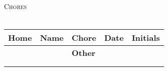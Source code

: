 \documentclass[12pt]{article}
\begin{document}
\begin{center}
  \LARGE \textsc{Chores}\\
  \\[0.5cm]

  \begin{tabularx}{\textwidth}{|c|c|X|c|c|}
    \hline
    \textbf{Home} & \textbf{Name} & \centering\textbf{Chore} & \textbf{Date} & \textbf{Initials} \\ \hline
    \hline
    
    \hline
    & & \centering\textbf{Other} & & \\ \hline
    & & & & \\ \hline
    & & & & \\ \hline
  \end{tabularx}
\end{center}
\end{document}
